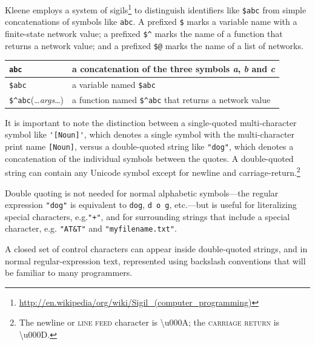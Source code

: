 \documentclass[letterpaper,12pt]{article}
\newcommand{\Kleene}{Kleene\xspace}
\newcommand{\acro}{\textsc}
\begin{document}
\Kleene{} employs a system of
sigils\footnote{\url{http://en.wikipedia/org/wiki/Sigil_(computer_programming)}}
to distinguish identifiers like \verb!$abc! from simple concatenations of symbols 
like \verb!abc!.  A prefixed
\verb!$! marks a variable name with a finite-state network value; a prefixed
\verb!$^! marks the
name of a function that returns a network value; and a prefixed \verb!$@! marks the name of
a list of networks.

\vspace{0.5cm} 

\begin{center}
\begin{tabular}{|l|l|}
\hline
\verb!abc! & a concatenation of the three symbols \emph{a}, \emph{b} and \emph{c} \\
\hline
\verb!$abc! & a variable named \verb!$abc! \\
\hline
\verb!$^abc!(\ldots{}\textit{args}\ldots{}) & a function named
\verb!$^abc! that returns a network value\\
\hline
\end{tabular}
\end{center}

\vspace{0.5cm}

It is important to note the distinction between a single-quoted
multi-character symbol like \verb!'[Noun]'!, which denotes a single
symbol with the multi-character print name \verb![Noun]!, versus a
double-quoted string like \verb!"dog"!, which denotes a concatenation of
the individual symbols between the quotes. A double-quoted string can
contain any Unicode symbol except for newline and
carriage-return.\footnote{The newline or \acro{line feed} character is
\textbackslash{}u000A; the \acro{carriage return} is
\textbackslash{}u000D.}

Double quoting is not needed for
normal alphabetic symbols---the regular expression \verb!"dog"! is
equivalent to \verb!dog!, \verb!d o g!, etc.---but
is useful for literalizing special characters, e.g.\@ \verb!"+"!, and for
surrounding strings that include a special character, e.g.\@
\verb!"AT&T"! and \verb!"myfilename.txt"!.

A closed set of control characters can appear inside double-quoted strings,
and in normal regular-expression text,
represented using backslash conventions that will be familiar to many
programmers.

\vspace{0.5cm} 
\end{document}

